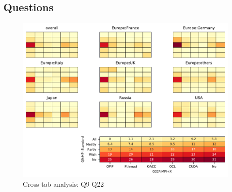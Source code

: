 
\subsection{Questions}


\begin{figure}
\begin{center}
\includegraphics[width=12cm]{../pdfs/Q9-Q22.pdf}
\caption{Cross-tab analysis: Q9-Q22}
\label{fig:Q9-Q22}
\end{center}
\end{figure}
